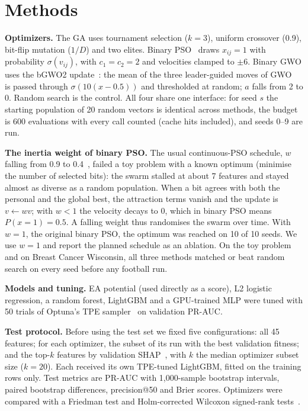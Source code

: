 \documentclass[runningheads]{llncs}
\begin{document}
\section{Methods}

\textbf{Optimizers.} The GA uses tournament selection ($k=3$), uniform crossover (0.9), bit-flip mutation ($1/D$) and two elites. Binary PSO~\cite{kennedy1997binary} draws $x_{ij} = 1$ with probability $\sigma(v_{ij})$, with $c_1 = c_2 = 2$ and velocities clamped to $\pm 6$. Binary GWO uses the bGWO2 update~\cite{emary2016bgwo}: the mean of the three leader-guided moves of GWO~\cite{mirjalili2014gwo} is passed through $\sigma(10(x - 0.5))$ and thresholded at random; $a$ falls from 2 to 0. Random search is the control. All four share one interface: for seed $s$ the starting population of 20 random vectors is identical across methods, the budget is 600 evaluations with every call counted (cache hits included), and seeds 0--9 are run.

\textbf{The inertia weight of binary PSO.} The usual continuous-PSO schedule, $w$ falling from 0.9 to 0.4~\cite{shi1998inertia}, failed a toy problem with a known optimum (minimise the number of selected bits): the swarm stalled at about 7 features and stayed almost as diverse as a random population. When a bit agrees with both the personal and the global best, the attraction terms vanish and the update is $v \leftarrow w v$; with $w < 1$ the velocity decays to 0, which in binary PSO means $P(x = 1) = 0.5$. A falling weight thus randomises the swarm over time. With $w = 1$, the original binary PSO, the optimum was reached on 10 of 10 seeds. We use $w = 1$ and report the planned schedule as an ablation. On the toy problem and on Breast Cancer Wisconsin, all three methods matched or beat random search on every seed before any football run.

\textbf{Models and tuning.} EA potential (used directly as a score), L2 logistic regression, a random forest, LightGBM and a GPU-trained MLP were tuned with 50 trials of Optuna's TPE sampler~\cite{akiba2019optuna,bergstra2011tpe} on validation PR-AUC.

\textbf{Test protocol.} Before using the test set we fixed five configurations: all 45 features; for each optimizer, the subset of its run with the best validation fitness; and the top-$k$ features by validation SHAP~\cite{lundberg2017shap}, with $k$ the median optimizer subset size ($k = 20$). Each received its own TPE-tuned LightGBM, fitted on the training rows only. Test metrics are PR-AUC with 1,000-sample bootstrap intervals, paired bootstrap differences, precision@50 and Brier scores. Optimizers were compared with a Friedman test and Holm-corrected Wilcoxon signed-rank tests~\cite{derrac2011tutorial,holm1979}.
\end{document}
